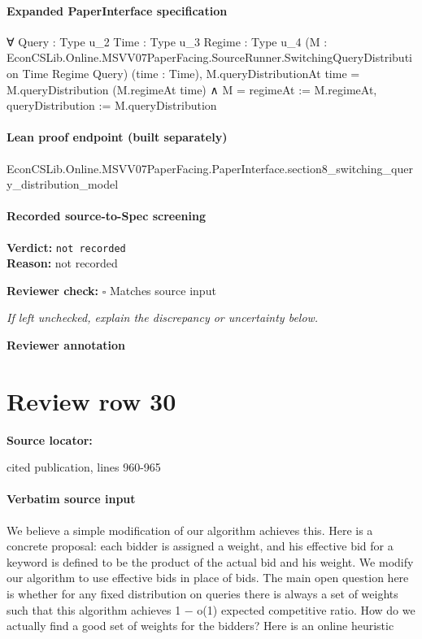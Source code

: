 \documentclass[10pt]{article}
\newcommand{\reviewerbox}{%
  \par\noindent\fbox{\parbox{0.96\linewidth}{\rule{0pt}{0.38in}}}\par
}
\newcommand{\reviewmatch}[1]{%
  \par\noindent\textbf{Reviewer check:} $\square$\; #1\par
  \noindent\emph{If left unchecked, explain the discrepancy or uncertainty below.}\par
}
\begin{document}
\paragraph{Expanded PaperInterface specification}
\begin{ReviewVerbatim}
∀ {Query : Type u_2} {Time : Type u_3} {Regime : Type u_4}
  (M : EconCSLib.Online.MSVV07PaperFacing.SourceRunner.SwitchingQueryDistribution Time Regime Query) (time : Time),
  M.queryDistributionAt time = M.queryDistribution (M.regimeAt time) ∧
    M = { regimeAt := M.regimeAt, queryDistribution := M.queryDistribution }
\end{ReviewVerbatim}

\paragraph{Lean proof endpoint (built separately)}\begin{ReviewVerbatim}
EconCSLib.Online.MSVV07PaperFacing.PaperInterface.section8_switching_query_distribution_model
\end{ReviewVerbatim}

\paragraph{Recorded source-to-Spec screening}
\textbf{Verdict:} \texttt{not recorded}
\\
\textbf{Reason:} not recorded
\reviewmatch{Matches source input}
\noindent\textbf{Reviewer annotation}\par
\reviewerbox
\clearpage
\hypertarget{source-claim-10e7f767c2d6f40b}{}
\section*{Review row 30}
\textbf{Source locator:} {\footnotesize\raggedright cited publication, lines 960-\allowbreak{}965\par}
\paragraph{Verbatim source input}
\begin{ReviewVerbatim}
We believe a simple modification of our algorithm achieves this. Here is a concrete proposal:
each bidder is assigned a weight, and his effective bid for a keyword is defined to be the product
of the actual bid and his weight. We modify our algorithm to use effective bids in place of
bids. The main open question here is whether for any fixed distribution on queries there is
always a set of weights such that this algorithm achieves 1 − o(1) expected competitive ratio.
How do we actually find a good set of weights for the bidders? Here is an online heuristic
\end{ReviewVerbatim}
\end{document}
